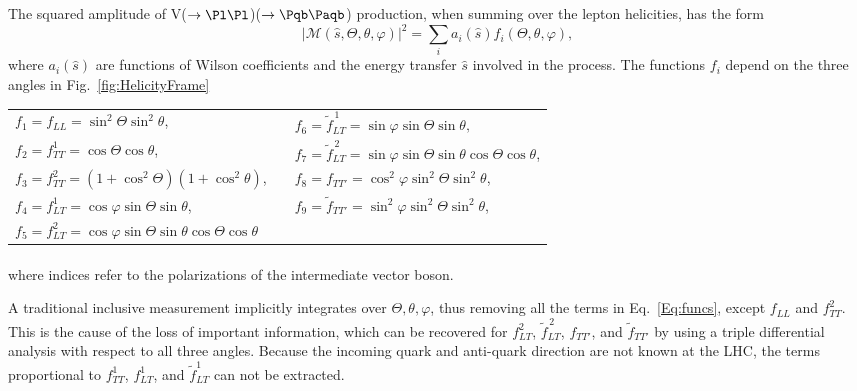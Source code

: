 \documentclass[a4paper,11pt]{article}
\newcommand{\Pb}{{{\Pqb}}\xspace}
\newcommand{\PAb}{{{{\Paqb}}}\xspace}
\renewcommand{\PV}{{{{V}}}\xspace}
\begin{document}
The squared amplitude of \PV($\to \Pl \Pl$)\PH($\to \Pb \PAb$) production, when summing over the lepton helicities, has the form
\begin{equation}
	|\mathcal{M} \left(\hat{s}, \Theta, \theta, \varphi \right)|^{2} = {\sum}_{i} a_i \left(\hat{s}\right) f_i \left(\Theta, \theta, \varphi \right),
\label{Eq:Amplitude}
\end{equation}
where $a_i\left(\hat{s}\right)$ are functions of Wilson coefficients and the energy transfer $\hat{s}$ involved in the process.
The functions $f_i$ depend on the three angles in Fig.~\ref{fig:HelicityFrame}

{\renewcommand{\arraystretch}{1.3}
\begin{table}[h!]
\begin{tabular}{lcl}
    $f_{1} = f_{LL} = \sin^{2}\Theta \sin^{2}\theta$, && $f_{6} = \tilde{f}^{\,1}_{LT} = \sin\varphi \sin\Theta \sin\theta, $\\
    $f_{2} = f^1_{TT} = \cos\Theta \cos\theta$, &&$f_{7} = \tilde{f}^{\,2}_{LT} = \sin\varphi \sin\Theta \sin\theta \cos\Theta \cos\theta$,\\
    $f_{3} = f^2_{TT} = (1+\cos^{2}\Theta)(1+ \cos^{2}\theta)$, && $f_{8} = f_{TT'} = \cos^{2}\varphi \sin^{2}{\Theta} \sin^{2}{\theta}$,\\
    $f_{4} = f^1_{LT} = \cos\varphi \sin\Theta \sin\theta$,&& $f_{9} = \tilde{f}_{TT'} =  \sin^{2}{\varphi} \sin^{2}{\Theta} \sin^{2}{\theta}$,\\
    $f_{5} = f^2_{LT} = \cos\varphi \sin\Theta \sin\theta \cos\Theta \cos\theta$
\end{tabular}
\end{table}
}
\vspace{-1.4cm}\begin{equation}
\phantom{x}\label{Eq:funcs}\end{equation}
\noindent where indices refer to the polarizations of the intermediate vector boson.

A traditional inclusive measurement implicitly integrates over $\Theta, \theta, \varphi$, thus removing all the terms in Eq.~\eqref{Eq:funcs}, except $f_{LL}$ and $f^2_{TT}$. 
This is the cause of the loss of important information, which can be recovered for $f^2_{LT}$, $\tilde f^{\,2}_{LT}$, $f_{TT'}$, and $\tilde f_{TT'}$  by using a triple differential analysis with respect to all three angles. 
Because the incoming quark and anti-quark direction are not known at the LHC, the terms proportional to $f^1_{TT}$, $f^1_{LT}$, and $\tilde{f}^1_{LT}$ can not be extracted.
\end{document}
